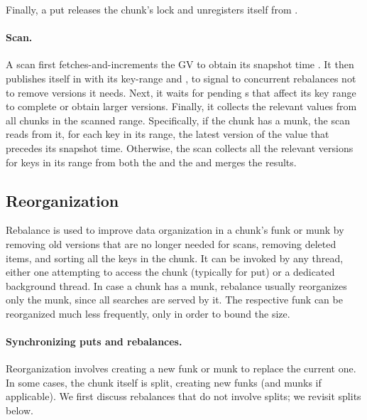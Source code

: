 Finally, a put releases the chunk's lock and unregisters itself from .




\paragraph{Scan.}
A scan first fetches-and-increments the GV to obtain its snapshot time . 
 It then publishes itself in  with its key-range and , to 
 signal to concurrent rebalances not to remove versions it needs. Next, it waits for pending
 s that affect its key range to complete or obtain larger versions. %
Finally, it collects the relevant values from all chunks in the scanned range.
Specifically, if the chunk has a munk, the scan reads from it, for each key in its range, 
the latest version of the value that precedes its snapshot time.
Otherwise, the scan collects all the relevant versions for keys in its range from both 
the    and the  and merges the results.
 

\subsection{Reorganization}
\label{ssec:rebalance}


Rebalance is used to improve data organization in a chunk's funk or munk by removing old versions that are no longer needed for scans, 
removing deleted items, and sorting all the keys in the chunk. 
It can be invoked by any thread, either one attempting to access the chunk (typically for put) or a dedicated background thread.
In case a chunk has a munk, rebalance usually reorganizes only  the munk, since all searches are served by it. 
The respective funk can be reorganized much less frequently, only in order to bound the  size. 

\paragraph{Synchronizing puts and rebalances.}
Reorganization involves creating a new funk or munk  to replace the  current one.  In some cases, the chunk itself is split, creating new funks (and munks if applicable). We first discuss rebalances that do not involve splits; we revisit splits below.

